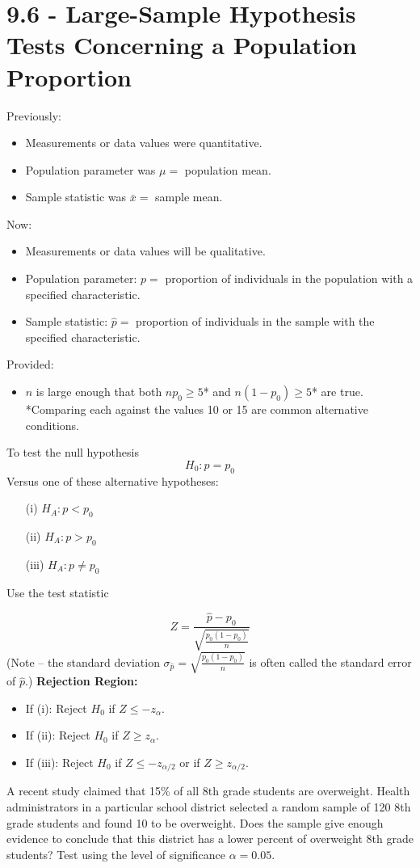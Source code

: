 \documentclass{report}
\begin{document}
\pagebreak
\section*{9.6 - Large-Sample Hypothesis Tests Concerning a Population Proportion}
Previously:
\begin{itemize}
    \item Measurements or data values were quantitative.
    \item Population parameter was $\mu =$ population mean.
    \item Sample statistic was $\bar{x} =$ sample mean.
\end{itemize}
\bigbreak \noindent
Now:
\begin{itemize}
    \item Measurements or data values will be qualitative.
    \item Population parameter: $p =$ proportion of individuals in the population with a specified characteristic.
    \item Sample statistic: $\hat{p} =$ proportion of individuals in the sample with the specified characteristic.
\end{itemize}
\bigbreak \noindent
Provided:
\begin{itemize}
    \item $n$ is large enough that both $np_0 \geq 5$* and $n(1 - p_0) \geq 5$* are true. \\ 
*Comparing each against the values 10 or 15 are common alternative conditions.
\end{itemize}
\bigbreak \noindent
To test the null hypothesis 
$$H_0: p = p_0$$
Versus one of these alternative hypotheses:
\begin{enumerate}
    \item[(i)] $H_A: p < p_0$
    \item[(ii)] $H_A: p > p_0$
    \item[(iii)] $H_A: p \neq p_0$
\end{enumerate}
\bigbreak \noindent
Use the test statistic 

$$Z = \frac{\hat{p} - p_0}{\sqrt{\frac{p_0(1-p_0)}{n}}}$$
\bigbreak \noindent
(Note -- the standard deviation $\sigma_{\hat{p}} = \sqrt{\frac{p_0(1-p_0)}{n}}$ is often called the standard error of $\hat{p}$.)
\bigbreak \noindent
\textbf{Rejection Region:}
\begin{itemize}
    \item If (i): Reject $H_0$ if $Z \leq -z_{\alpha}$.
    \item If (ii): Reject $H_0$ if $Z \geq z_{\alpha}$.
    \item If (iii): Reject $H_0$ if $Z \leq -z_{\alpha/2}$ or if $Z \geq z_{\alpha/2}$.
\end{itemize}

\pagebreak
\q
A recent study claimed that 15\% of all 8th grade students are overweight. Health administrators in a particular school district selected a random sample of 120 8th grade students and found 10 to be overweight. Does the sample give enough evidence to conclude that this district has a lower percent of overweight 8th grade students? Test using the level of significance $\alpha = 0.05$.
\end{document}
